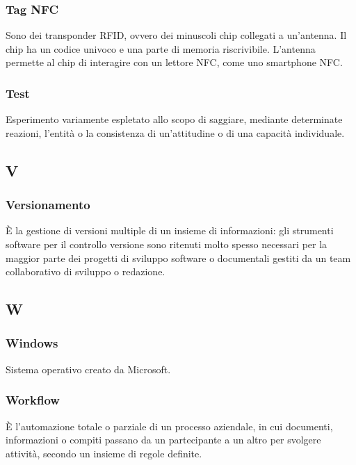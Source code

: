 \subsubsection*{Tag NFC} Sono dei transponder RFID, ovvero dei minuscoli chip collegati a un'antenna. Il chip ha un codice univoco e una parte di memoria riscrivibile. L'antenna permette al chip di interagire con un lettore NFC, come uno smartphone NFC.
\subsubsection*{Test} Esperimento variamente espletato allo scopo di saggiare, mediante determinate reazioni, l'entità o la consistenza di un'attitudine o di una capacità individuale.
\subsection*{V}
\subsubsection*{Versionamento} È la gestione di versioni multiple di un insieme di informazioni: gli strumenti software per il controllo versione sono ritenuti molto spesso necessari per la maggior parte dei progetti di sviluppo software o documentali gestiti da un team collaborativo di sviluppo o redazione.
\subsection*{W}
\subsubsection*{Windows} Sistema operativo creato da Microsoft.
\subsubsection*{Workflow} È l’automazione totale o parziale di un processo aziendale, in cui documenti, informazioni o compiti passano da un partecipante a un altro per svolgere attività, secondo un insieme di regole definite.

